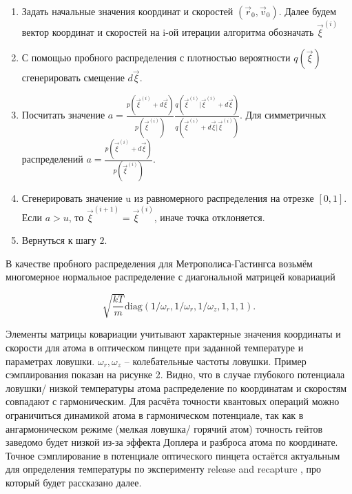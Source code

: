 \begin{enumerate}
	\item Задать начальные значения координат и скоростей $\left(\vec{r}_0,\vec{v}_0\right)$. Далее будем вектор координат и скоростей на i-ой итерации алгоритма обозначать ${\vec{\xi}}^{\left(i\right)}$

	\item С помощью пробного распределения с плотностью вероятности $q\left(\vec{\xi}\right)$ сгенерировать смещение $d\vec{\xi}$.

	\item Посчитать значение $a=\frac{p\left({\vec{\xi}}^{\left(i\right)}+d\vec{\xi}\right)}{p\left({\vec{\xi}}^{\left(i\right)}\right)}\frac{q\left({\vec{\xi}}^{\left(i\right)}|{\vec{\xi}}^{\left(i\right)}+d\vec{\xi}\right)}{q\left({\vec{\xi}}^{\left(i\right)}+d\vec{\xi}|{\vec{\xi}}^{\left(i\right)}\right)}$. Для симметричных распределений $a=\frac{p\left({\vec{\xi}}^{\left(i\right)}+d\vec{\xi}\right)}{p\left({\vec{\xi}}^{\left(i\right)}\right)}$.

	\item Сгенерировать значение u из равномерного распределения на отрезке $\left[0,1\right]$. Если $a>u$, то ${\vec{\xi}}^{\left(i+1\right)}={\vec{\xi}}^{\left(i\right)}$, иначе точка отклоняется.

	\item Вернуться к шагу $2$.
\end{enumerate}

В качестве пробного распределения для Метрополиса-Гастингса возьмём многомерное нормальное распределение с диагональной матрицей ковариаций

\begin{equation}
	\sqrt{\frac{kT}{m}}\text{diag}\left(1/\omega_r,1/\omega_r, 1/\omega_z, 1, 1, 1\right).
\end{equation}

Элементы матрицы ковариации учитывают характерные значения координаты и скорости для атома в оптическом пинцете при заданной температуре и параметрах ловушки. $\omega_r,\omega_z$ – колебательные частоты ловушки. Пример сэмплирования показан на рисунке 2. Видно, что в случае глубокого потенциала ловушки/ низкой температуры атома распределение по координатам и скоростям совпадают с гармоническим. 
Для расчёта точности квантовых операций можно ограничиться динамикой атома в гармоническом потенциале, так как в ангармоническом режиме (мелкая ловушка/ горячий атом) точность гейтов заведомо будет низкой из-за эффекта Доплера и разброса атома по координате. Точное сэмплирование в потенциале оптического пинцета остаётся актуальным для определения температуры по эксперименту release and recapture \cite{Tuchendler2008EnergyDA}, про который будет рассказано далее. 

